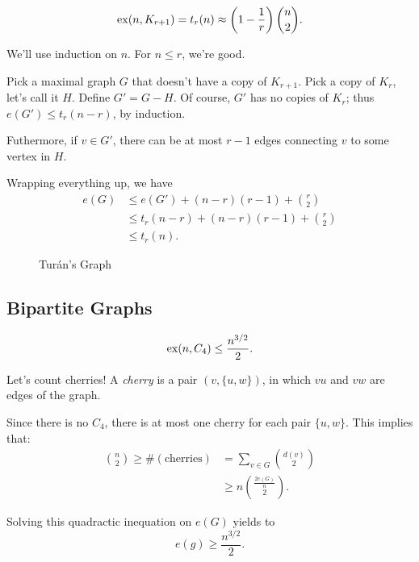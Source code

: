 \begin{thm}[Turán, 1941]
	\[
		\operatorname{ex}(n, K_{r+1}) = t_r(n) \approx \left(1 - \frac{1}{r}\right)\binom{n}{2}.
	\]
\end{thm}

\begin{dem}
	We'll use induction on $n$. For $n \le r$, we're good.

	Pick a maximal graph $G$ that doesn't have a copy of $K_{r+1}$. Pick a copy of $K_r$, let's call it $H$. Define $G' = G - H$. Of course, $G'$ has no copies of $K_r$; thus $e(G') \le t_r(n-r)$, by induction.

	Futhermore, if $v \in G'$, there can be at most $r - 1$ edges connecting $v$ to some vertex in $H$.

	Wrapping everything up, we have
	\begin{align*}
		e(G) &\le e(G') + (n-r)(r-1) + \binom{r}{2}\\
			 &\le t_r(n-r) + (n-r)(r-1) + \binom{r}{2}\\
			 &\le t_r(n).
	\end{align*}
\end{dem}

\begin{figure}[h]
    \centering
    \caption{Turán's Graph}
    \label{fig:grafo-de-turan}
\end{figure}

\subsection{Bipartite Graphs}

\begin{thm}[Erd\H{o}s, 1935]
	\[
		\operatorname{ex}(n, C_4) \le \frac{n^{3/2}}{2}.
	\]
\end{thm}

\begin{dem}
	Let's count cherries! A \emph{cherry} is a pair $(v, \{u, w\})$, in which $vu$ and $vw$ are edges of the graph. 

	Since there is no $C_4$, there is at most one cherry for each pair $\{u, w\}$. This implies that:
	 \begin{align*}
		 \binom{n}{2} \ge \#(\text{cherries}) &= \sum_{v \in G} \binom{d(v)}{2}\\
			&\ge n\binom{\frac{2e(G)}{n}}{2}.
	\end{align*}

	Solving this quadractic inequation on $e(G)$ yields to  \[
		e(g) \ge \frac{n^{3/2}}{2}.
	\]
\end{dem}

